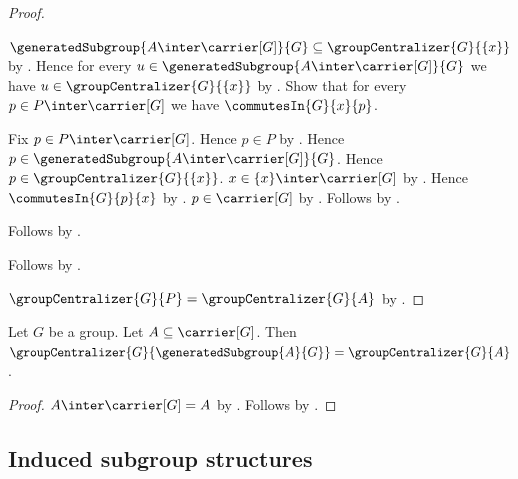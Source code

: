 \begin{proof}
\begin{subproof}
\begin{subproof}
                $\generatedSubgroup{A\inter\carrier[G]}{G}
                    \subseteq\groupCentralizer{G}{\{x\}}$ by
                .
            Hence for every
                $u\in\generatedSubgroup{A\inter\carrier[G]}{G}$
                we have $u\in\groupCentralizer{G}{\{x\}}$ by
                .
            Show that for every $p\in P\inter\carrier[G]$ we have
                $\commutesIn{G}{x}{p}$.
            \begin{subproof}
                Fix $p\in P\inter\carrier[G]$.
                Hence $p\in P$ by .
                Hence
                    $p\in\generatedSubgroup{A\inter\carrier[G]}{G}$.
                Hence $p\in\groupCentralizer{G}{\{x\}}$.
                $x\in\{x\}\inter\carrier[G]$ by
                    .
                Hence $\commutesIn{G}{p}{x}$ by
                    .
                $p\in\carrier[G]$ by .
                Follows by .
            \end{subproof}
            Follows by .
        \end{subproof}
        Follows by .
    \end{subproof}
    $\groupCentralizer{G}{P}=\groupCentralizer{G}{A}$ by
        .
\end{proof}

\begin{theorem}\label{group_centralizer_generated_subgroup}
    Let $G$ be a group.
    Let $A\subseteq\carrier[G]$.
    Then
        $\groupCentralizer{G}{\generatedSubgroup{A}{G}}=
         \groupCentralizer{G}{A}$.
\end{theorem}
\begin{proof}
    $A\inter\carrier[G]=A$ by
        .
    Follows by
        .
\end{proof}

\subsection{Induced subgroup structures}

